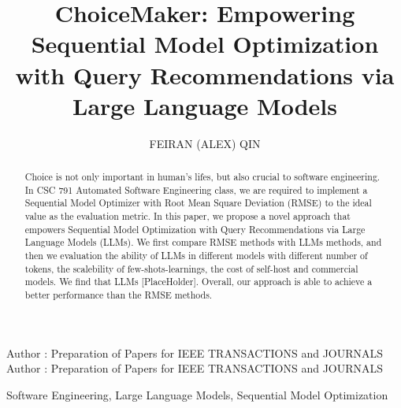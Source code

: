 \documentclass{ieeeaccess}
\begin{document}

\title{ChoiceMaker: Empowering Sequential Model Optimization with Query Recommendations via Large Language Models}
\author{\uppercase{Feiran (Alex) Qin}}
\address[1]{Computer Science Department, North Carolina State University, Raleigh, NC 27695, USA}


\tfootnote{
}

\markboth
{Author \headeretal: Preparation of Papers for IEEE TRANSACTIONS and JOURNALS}
{Author \headeretal: Preparation of Papers for IEEE TRANSACTIONS and JOURNALS}


\begin{abstract}
Choice is not only important in human's lifes, but also crucial to software engineering. In CSC 791 Automated Software Engineering class, we are required to implement a Sequential Model Optimizer with Root Mean Square Deviation (RMSE) to the ideal value as the evaluation metric. In this paper, we propose a novel approach that empowers Sequential Model Optimization with Query Recommendations via Large Language Models (LLMs). We first compare RMSE methods with LLMs methods, and then we evaluation the ability of LLMs in different models with different number of tokens, the scalebility of few-shots-learnings, the cost of self-host and commercial models. We find that LLMs [PlaceHolder]. Overall, our approach is able to achieve a better performance than the RMSE methods. 
\end{abstract}

\begin{keywords}
Software Engineering, Large Language Models, Sequential Model Optimization
\end{keywords}

\titlepgskip=-15pt

\maketitle
\end{document}
